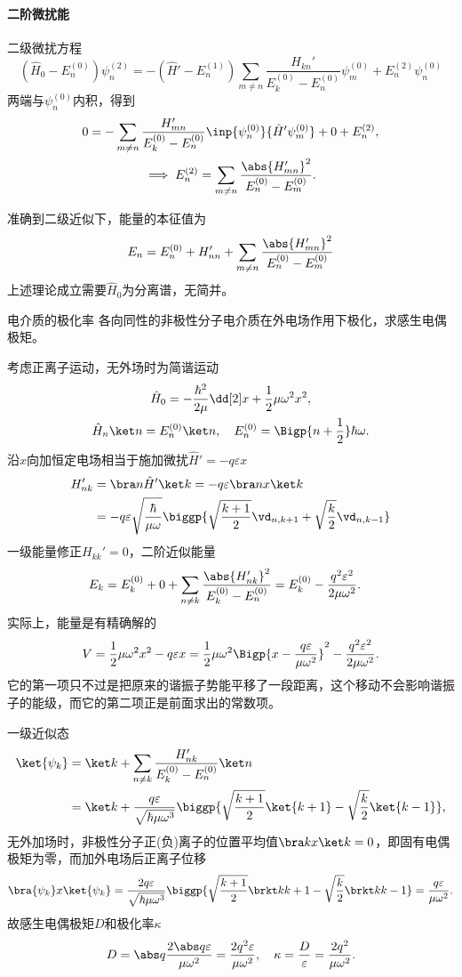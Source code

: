 \paragraph{二阶微扰能}二级微扰方程
\[
	(\hat H_0-E_n^{(0)})\psi_n^{(2)}=-(\hat H'-E_n^{(1)})\sum_{m\neq n}\frac{H_{kn}'}{E_k^{(0)}-E_n^{(0)}}\psi_m^{(0)}+E_n^{(2)}\psi_n^{(0)}
\]
两端与$\psi_n^{(0)}$内积，得到
\begin{gather}\notag
	0=-\sum_{m\neq n}\frac{H_{mn}'}{E_k^{(0)}-E_n^{(0)}}\inp{\psi_n^{(0)}}{\hat H'\psi_m^{(0)}}+0+E_n^{(2)},\\
	\implies E_n^{(2)}=\sum_{m\neq n}\frac{\abs{H_{mn}'}^2}{E_n^{(0)}-E_m^{(0)}}.
\end{gather}

准确到二级近似下，能量的本征值为
\begin{align}
	E_n=E_n^{(0)}+H_{nn}'+\sum_{m\neq n}\frac{\abs{H_{mn}'}^2}{E_n^{(0)}-E_m^{(0)}}
\end{align}
上述理论成立需要$\hat H_0$为分离谱，无简并。
\begin{example}{电介质的极化率}{}
	各向同性的非极性分子电介质在外电场作用下极化，求感生电偶极矩。

	考虑正离子运动，无外场时为简谐运动
	\begin{gather*}
		\hat H_0=-\frac{\hbar^2}{2\mu}\dd[2]x+\frac12\mu\omega^2x^2,\\
		\hat H_n\ket n=E_n^{(0)}\ket n,\quad E_n^{(0)}=\Bigp{n+\frac12}\hbar\omega.
	\end{gather*}
	沿$x$向加恒定电场相当于施加微扰$\hat H'=-q\varepsilon x$
	\begin{align*}
		H_{nk}'&=\bra n\hat H'\ket k=-q\varepsilon\bra nx\ket k\\
		&=-q\varepsilon\sqrt{\frac\hbar{\mu\omega}}\biggp{\sqrt{\frac{k+1}2}\vd_{n,k+1}+\sqrt{\frac k2}\vd_{n,k-1}}
	\end{align*}
	一级能量修正$H_{kk}'=0$，二阶近似能量
	\begin{align*}
		E_k&=E_k^{(0)}+0+\sum_{n\neq k}\frac{\abs{H_{nk}'}^2}{E_k^{(0)}-E_n^{(0)}}=E_k^{(0)}-\frac{q^2\varepsilon^2}{2\mu\omega^2}.
	\end{align*}
	实际上，能量是有精确解的
	\[
V=\frac12\mu\omega^2x^2-q\varepsilon x=\frac12\mu\omega^2\Bigp{x-\frac{q\varepsilon}{\mu\omega^2}}^2-\frac{q^2\varepsilon^2}{2\mu\omega^2}.
\]
	它的第一项只不过是把原来的谐振子势能平移了一段距离，这个移动不会影响谐振子的能级，而它的第二项正是前面求出的常数项。

	一级近似态
	\begin{align*}
		\ket{\psi_k}&=\ket k+\sum_{n\neq k}\frac{H_{nk}'}{E_k^{(0)}-E_n^{(0)}}\ket n\\
		&=\ket k+\frac{q\varepsilon}{\sqrt{\hbar\mu\omega^3}}\biggp{\sqrt{\frac{k+1}2}\ket{k+1}-\sqrt{\frac k2}\ket{k-1}},
	\end{align*}
	无外加场时，非极性分子正(负)离子的位置平均值$\bra kx\ket k=0$，即固有电偶极矩为零，而加外电场后正离子位移
	\[
		\bra{\psi_k}x\ket{\psi_k}=\frac{2q\varepsilon}{\sqrt{\hbar\mu\omega^3}}\biggp{\sqrt{\frac{k+1}2}\brkt k{k+1}-\sqrt{\frac k2}\brkt k{k-1}}=\frac{q\varepsilon}{\mu\omega^2}.
\]
	故感生电偶极矩$D$和极化率$\kappa$
	\[
D=\abs q\frac{2\abs q\varepsilon}{\mu\omega^2}=\frac{2q^2\varepsilon}{\mu\omega^2},\quad \kappa=\frac D\varepsilon=\frac{2q^2}{\mu\omega^2}.
\]
\end{example}
